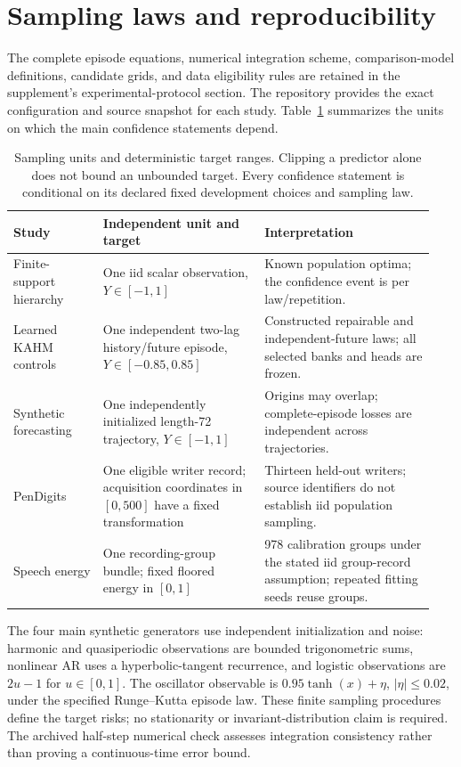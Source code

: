 \section{Sampling laws and reproducibility}
\label{app:protocols}

The complete episode equations, numerical integration scheme, comparison-model
definitions, candidate grids, and data eligibility rules are retained in the
supplement's experimental-protocol section. The repository provides the exact
configuration and source snapshot for each study. Table~\ref{tab:sampling-summary}
summarizes the units on which the main confidence statements depend.

\begin{table}[h]
\centering\small
\begin{tabular}{@{}p{0.20\linewidth}p{0.36\linewidth}p{0.38\linewidth}@{}}
\toprule
Study & Independent unit and target & Interpretation \\
\midrule
Finite-support hierarchy & One iid scalar observation, $Y\in[-1,1]$ & Known population optima; the confidence event is per law/repetition. \\
Learned KAHM controls & One independent two-lag history/future episode, $Y\in[-0.85,0.85]$ & Constructed repairable and independent-future laws; all selected banks and heads are frozen. \\
Synthetic forecasting & One independently initialized length-72 trajectory, $Y\in[-1,1]$ & Origins may overlap; complete-episode losses are independent across trajectories. \\
PenDigits & One eligible writer record; acquisition coordinates in $[0,500]$ have a fixed transformation & Thirteen held-out writers; source identifiers do not establish iid population sampling. \\
Speech energy & One recording-group bundle; fixed floored energy in $[0,1]$ & 978 calibration groups under the stated iid group-record assumption; repeated fitting seeds reuse groups. \\
\bottomrule
\end{tabular}
\caption{Sampling units and deterministic target ranges. Clipping a predictor
alone does not bound an unbounded target. Every confidence statement is
conditional on its declared fixed development choices and sampling law.}
\label{tab:sampling-summary}
\end{table}

The four main synthetic generators use independent initialization and noise:
harmonic and quasiperiodic observations are bounded trigonometric sums,
nonlinear AR uses a hyperbolic-tangent recurrence, and logistic observations
are $2u-1$ for $u\in[0,1]$. The oscillator observable is
$0.95\tanh(x)+\eta$, $|\eta|\leq0.02$, under the specified Runge--Kutta
episode law. These finite sampling procedures define the target risks; no
stationarity or invariant-distribution claim is required. The archived
half-step numerical check assesses integration consistency rather than
proving a continuous-time error bound.

